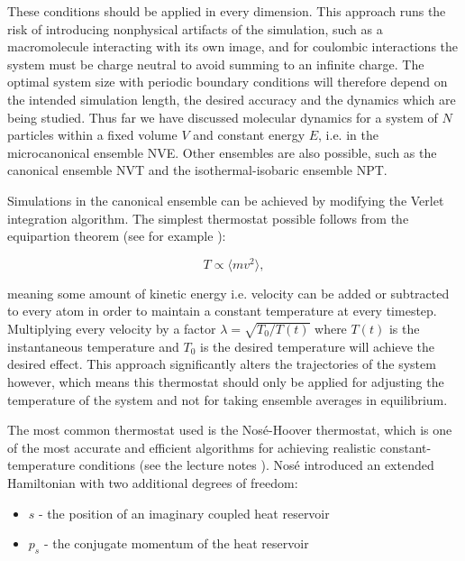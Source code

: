 These conditions should be applied in every dimension.
This approach runs the risk of introducing nonphysical artifacts
of the simulation, such as a macromolecule interacting with its own image,
and for coulombic interactions the system must be charge neutral to avoid
summing to an infinite charge.
The optimal system size with periodic boundary conditions
will therefore depend on the intended simulation length, the desired accuracy
and the dynamics which are being studied.
\newline
\newline
Thus far we have discussed molecular dynamics for a system of $N$ particles
within a fixed volume $V$ and constant energy $E$, i.e. in the
microcanonical ensemble NVE. Other ensembles are also possible,
such as the canonical ensemble NVT and the isothermal-isobaric ensemble
NPT.
\par
Simulations in the canonical ensemble can be achieved by modifying the Verlet
integration algorithm. The simplest thermostat possible
follows from the equipartion theorem (see for example \cite{equipart}):

\begin{equation}
 T \propto \langle mv^2 \rangle , 
\end{equation}

meaning some amount of kinetic energy i.e. velocity
can be added or subtracted to every atom in order to maintain
a constant temperature at every timestep.
Multiplying every velocity by a factor $\lambda = \sqrt{T_0 / T(t)}$
where $T(t)$ is the instantaneous temperature and $T_0$
is the desired temperature will achieve the desired effect.
This approach significantly alters the trajectories of the system however,
which means this thermostat should only be applied for adjusting
the temperature of the system and not for taking ensemble averages
in equilibrium.
\par
The most common thermostat used is the Nosé-Hoover thermostat,
which is one of the most accurate and efficient algorithms
for achieving realistic constant-temperature conditions
(see the lecture notes \parencite[Shell, M. Scott]{che210D2012}).
Nosé introduced an extended Hamiltonian with two additional degrees of freedom:

\begin{itemize}
    \item $s$ - the position of an imaginary coupled heat reservoir
    \item $p_s$ - the conjugate momentum of the heat reservoir
\end{itemize}


